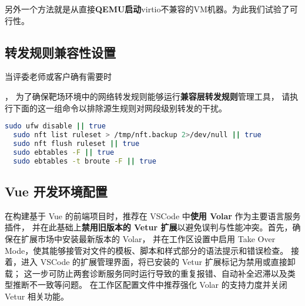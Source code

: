 \documentclass[lang=cn,10pt]{elegantbook}
\begin{document}
另外一个方法就是从直接\textbf{QEMU启动}virtio不兼容的VM机器。为此我们试验了可行性。


\subsection{转发规则兼容性设置}

\hypertarget{subsec:forward_setting}{当评委老师或客户确有需要时}，
为了确保靶场环境中的网络转发规则能够运行\textbf{兼容层转发规则}管理工具，
请执行下面的这一组命令以排除源生规则对网段级别转发的干扰。


\begin{lstlisting}[language=bash]
  sudo ufw disable || true
  sudo nft list ruleset > /tmp/nft.backup 2>/dev/null || true
  sudo nft flush ruleset || true
  sudo ebtables -F || true
  sudo ebtables -t broute -F || true
\end{lstlisting}

\subsection{Vue 开发环境配置}
在构建基于 Vue 的前端项目时，推荐在 VSCode 中\textbf{使用 Volar} 作为主要语言服务插件，
并在此基础上\textbf{禁用旧版本的 Vetur 扩展}以避免误判与性能冲突。首先，确保在扩展市场中安装最新版本的 Volar，
并在工作区设置中启用 Take Over Mode，使其能够接管对文件的模板、脚本和样式部分的语法提示和错误检查。
接着，进入 VSCode 的扩展管理界面，将已安装的 Vetur 扩展标记为禁用或直接卸载；
这一步可防止两套诊断服务同时运行导致的重复报错、自动补全迟滞以及类型推断不一致等问题。
在工作区配置文件中推荐强化 Volar 的支持力度并关闭 Vetur 相关功能。
\end{document}

